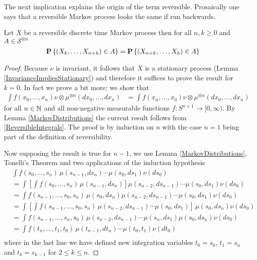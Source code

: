 The next implication explains the origin of the term reversible.
Prosaically one says that a reversible Markov process looks the same
if run backwards.
\begin{prop}Let $X$ be a reversible discrete time Markov process then
  for all $n,k \geq 0$ and $A \in \mathcal{S}^{\otimes n}$ 
\begin{align*}
\textbf{P}\left \{(X_k, \dotsc, X_{n+k}) \in A \right \} &= 
\textbf{P}\left \{(X_{n+k}, \dotsc, X_k) \in A \right \} 
\end{align*}
\end{prop}
\begin{proof}
Because $\nu$ is invariant, it follows that $X$ is a stationary
process (Lemma \ref{InvarianceImpliesStationary}) and therefore it
suffices to prove the result for $k=0$.
In fact we prove a bit more; we show that 
\begin{align}
\int f(x_0, \dotsc, x_n)
\nu \otimes \mu^{\otimes n}(dx_0, \dotsc, dx_n) &= \int f(x_n, \dotsc,x_0)
\nu \otimes \mu^ {\otimes n}(dx_0,\dotsc, dx_n)
\end{align}\label{ReversibleIntegrals}
for all $n \in \mathbb{N}$ and all non-negative measurable functions $f
: S^{n+1} \to [0,\infty)$.  By Lemma
\ref{MarkovDistributions} the current result follows from \eqref{ReversibleIntegrals}.
The proof is by induction on $n$ with the case $n=1$ being part of the
definition of reversibility.

Now supposing the result is true for $n-1$, we use Lemma
\ref{MarkovDistributions}, Tonelli's Theorem
and two applications of the induction hypothesis
\begin{align*}
&\int f(s_0, \dotsc, s_n) \, \mu(s_{n-1},ds_n) \dotsm
  \mu(s_0, ds_1) \nu(ds_0) \\
&=\int \left [ \int f(s_0, \dotsc, s_n) \,
  \mu(s_{n-1},ds_n) \right ]\mu(s_{n-2},ds_{n-1}) \dotsm
  \mu(s_0, ds_1) \nu(ds_0) \\
&=\int f(s_{n-1}, \dotsc, s_0, s_n) \, \mu(s_0,ds_n)
  \mu(s_{n-2}, ds_{n-1})\dotsm
  \mu(s_0, ds_1) \nu(ds_0) \\
&=\int \left [ \int f(s_{n-1}, \dotsc, s_0, s_n) \, 
  \mu(s_{n-2}, ds_{n-1})\dotsm
  \mu(s_0, ds_1) \right ] \, \mu(s_0,ds_n) \nu(ds_0) \\
&=\int f(s_{n-1}, \dotsc, s_n, s_0) \, 
  \mu(s_{n-2}, ds_{n-1})\dotsm
  \mu(s_n, ds_1) \mu(s_0,ds_n) \nu(ds_0) \\
&=\int f(t_{n}, \dotsc, t_1, t_0) \, 
  \mu(t_{n-1}, dt_{n})\dotsm
  \mu(t_0,t_1) \nu(dt_0) \\
\end{align*}
where in the last line we have defined new integration variables $t_0
= s_0$, $t_1 = s_n$ and 
$t_k = s_{k-1}$ for $2 \leq k \leq n$.
\end{proof}

